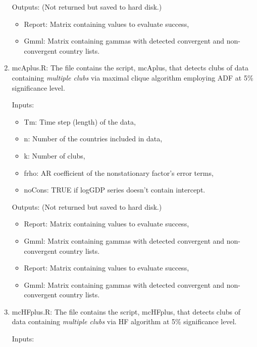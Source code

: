 \documentclass{article}
\begin{document}
\begin{enumerate}
	Outputs: (Not returned but saved to hard disk.)
	
	\begin{itemize}
		\item Report: Matrix containing values to evaluate success,
		\item Gmml: Matrix containing gammas with detected convergent and non-convergent country lists.
	\end{itemize}		 	
	
		\item mcAplus.R: The file contains the script, mcAplus, that detects clubs of data containing \textit{multiple clubs} via maximal clique algorithm employing ADF at 5\% significance level.
		
		Inputs:
		\begin{itemize}
			
			\item Tm: Time step (length) of the data,
			\item n: Number of the countries included in data,
			\item k: Number of clubs, 
			\item frho: AR coefficient of the nonstationary factor's error terms,
			\item noCons: TRUE if logGDP series doesn't contain intercept.
		\end{itemize}
		
		Outputs: (Not returned but saved to hard disk.)
		
		\begin{itemize}
			\item Report: Matrix containing values to evaluate success,
			\item Gmml: Matrix containing gammas with detected convergent and non-convergent country lists.
		\end{itemize}		 	
	\begin{itemize}
		\item Report: Matrix containing values to evaluate success,
		\item Gmml: Matrix containing gammas with detected convergent and non-convergent country lists.
	\end{itemize}		 	
	
	\item mcHFplus.R: The file contains the script, mcHFplus, that detects clubs of data containing \textit{multiple clubs} via HF algorithm at 5\% significance level.
	
	Inputs:
	\begin{itemize}
		

\end{itemize}
\end{enumerate}
\end{document}
